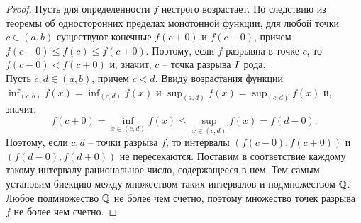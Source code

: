     \begin{proof}
        Пусть для определенности $f$ нестрого возрастает. По следствию из теоремы об односторонних пределах монотонной функции, для любой точки $c \in (a, b)$ существуют конечные $f(c + 0)$ и $f(c - 0)$, причем $f(c - 0) \leq f(c) \leq f(c + 0)$. Поэтому, если $f$ разрывна в точке $c$, то $f(c - 0) < f(c + 0)$ и, значит, $c$ -- точка разрыва ${\MakeUppercase{\romannumeral 1}}$ рода.\\
        Пусть $c, d \in (a, b)$, причем $c < d$. Ввиду возрастания функции $\inf_{(c, b)}f(x) = \inf_{(c, d)}f(x)$ и $\sup_{(a, d)}f(x) = \sup_{(c, d)}f(x)$ и, значит,
        \[f(c + 0) = \inf_{x \in (c, d)} f(x) \leq \sup_{x \in (c, d)} f(x) = f(d - 0).\]
        Поэтому, если $c, d$ -- точки разрыва $f$, то интервалы $(f(c - 0), f(c + 0))$ и $(f(d - 0), f(d + 0))$ не пересекаются. Поставим в соответствие каждому такому интервалу рациональное число, содержащееся в нем. Тем самым установим биекцию между множеством таких интервалов и подмножеством $\mathbb{Q}$. Любое подмножество $\mathbb{Q}$ не более чем счетно, поэтому множество точек разрыва $f$ не более чем счетно.
    \end{proof}